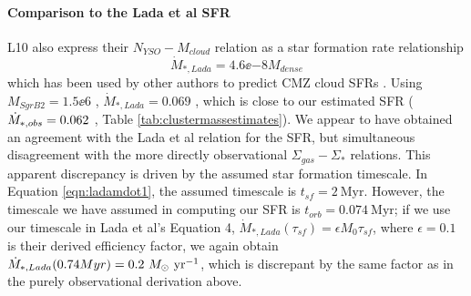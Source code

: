 \documentclass[twocolumn]{aastex61}
\begin{document}
\paragraph{Comparison to the Lada et al SFR}
L10 also express their $N_{YSO}-M_{cloud}$ relation as a star
formation rate relationship
\begin{equation}
    \label{eqn:ladamdot1}
    \dot{M}_{*,Lada} = 4.6\ee{-8} M_{dense}
\end{equation}
which has been used by other authors to predict CMZ cloud SFRs
\citep[e.g.,][]{Kauffmann2017c}.
Using
$M_{Sgr B2} = 1.5\ee{6}$ \msun, $\dot{M}_{*,Lada} = 0.069$ \msun \peryr, which
is close to our estimated SFR ($\dot{M}_{*,obs}=0.062$ \msun
\peryr, Table \ref{tab:clustermassestimates}).  We appear to have
obtained an agreement with the Lada et
al relation for the SFR, but simultaneous disagreement with the more directly
observational $\Sigma_{gas}-\Sigma_*$ relations. This apparent
discrepancy is driven by the assumed star
formation timescale.  In Equation \ref{eqn:ladamdot1}, the assumed timescale
is $t_{sf} = 2\mathrm{~Myr}$.  However, the timescale we have assumed in computing 
our SFR is ${t_{orb} = 0.074 \mathrm{~Myr}}$; if we use our timescale in
Lada et al's Equation
4, $\dot{M}_{*,Lada}(\tau_{sf}) = \epsilon M_0 \tau_{sf}$, where $\epsilon=0.1$
is their derived efficiency factor, we again obtain $\dot{M}_{*,Lada}(0.74 Myr)
= 0.2~M_{\odot}~\textrm{yr}^{-1}$, which is discrepant by the same factor as in the purely
observational derivation above.  

\end{document}
